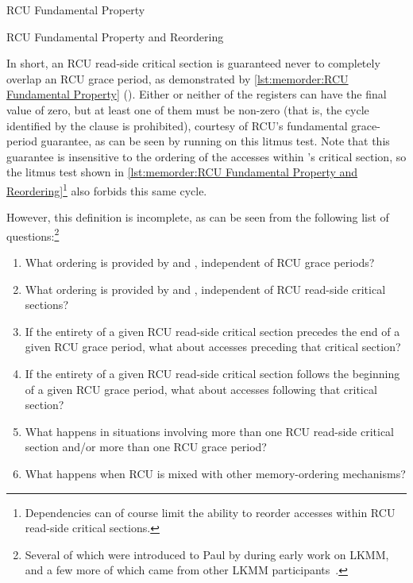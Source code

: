 \begin{listing}

\caption{RCU Fundamental Property}
\label{lst:memorder:RCU Fundamental Property}
\end{listing}

\begin{listing}

\caption{RCU Fundamental Property and Reordering}
\label{lst:memorder:RCU Fundamental Property and Reordering}
\end{listing}

In short, an RCU read-side critical section is guaranteed never to
completely overlap an RCU grace period, as demonstrated by
\cref{lst:memorder:RCU Fundamental Property}
().
Either or neither of the  registers can have the final value of zero,
but at least one of them must be non-zero (that is, the cycle identified
by the  clause is prohibited), courtesy of RCU's fundamental
grace-period guarantee, as can be seen by running  on this litmus test.
Note that this guarantee is insensitive to the ordering of the accesses
within 's critical section, so the litmus test shown in
\cref{lst:memorder:RCU Fundamental Property and Reordering}\footnote{
	Dependencies can of course limit the ability to reorder accesses
	within RCU read-side critical sections.}
also forbids this same cycle.

However, this definition is incomplete, as can be seen from the following
list of questions:\footnote{
	Several of which were introduced to Paul by  during
	early work on LKMM, and a few more of which came from other
	LKMM participants~\cite{Alglave:2018:FSC:3173162.3177156}.}

\begin{enumerate}
\item	What ordering is provided by 
	and , independent of RCU grace periods?
\item	What ordering is provided by 
	and , independent of RCU read-side
	critical sections?
\item	If the entirety of a given RCU read-side critical section
	precedes the end of a given RCU grace period, what about
	accesses preceding that critical section?
\item	If the entirety of a given RCU read-side critical section
	follows the beginning of a given RCU grace period, what about
	accesses following that critical section?
\item	What happens in situations involving more than one RCU read-side
	critical section and/or more than one RCU grace period?
\item	What happens when RCU is mixed with other memory-ordering
	mechanisms?
\end{enumerate}


